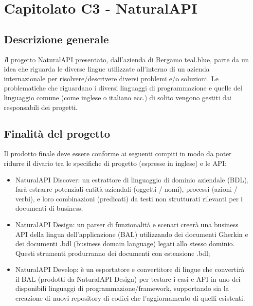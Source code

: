 \section{Capitolato C3 - NaturalAPI }

\subsection{Descrizione generale}
\textit Il progetto NaturalAPI presentato, dall’azienda di Bergamo teal.blue, parte da un idea che riguarda le diverse lingue utilizzate all’interno di un azienda internazionale per risolvere/descrivere diversi problemi e/o soluzioni. Le problematiche che riguardano i diversi linguaggi di programmazione e quelle del linguaggio comune (come inglese o italiano ecc.) di solito vengono gestiti dai responsabili dei progetti.

\subsection{Finalità del progetto}
Il prodotto finale deve essere conforme ai seguenti compiti in modo da poter ridurre il divario tra le specifiche di progetto (espresse in inglese) e  le API: 
\begin{itemize}
	\item NaturalAPI Discover: un estrattore di linguaggio di dominio aziendale (BDL), farà estrarre potenziali entità aziendali (oggetti / nomi), processi (azioni / verbi), e loro combinazioni (predicati) da testi non strutturati rilevanti per i documenti di business; 
	\item NaturalAPI Design:  un parser di funzionalità e scenari creerà una business API della lingua dell’applicazione (BAL) utilizzando dei documenti Gherkin e dei documenti .bdl (business domain language) legati allo stesso dominio. Questi strumenti produrranno dei documenti con estensione .bdl;
	\item NaturalAPI Develop: è un esportatore e convertitore di lingue che convertirà il BAL (prodotti da NaturalAPI Design) per testare i casi e API in uno dei disponibili linguaggi di programmazione/framework, supportando sia la creazione di nuovi repository di codici che l'aggiornamento di quelli esistenti. 
\end{itemize}

